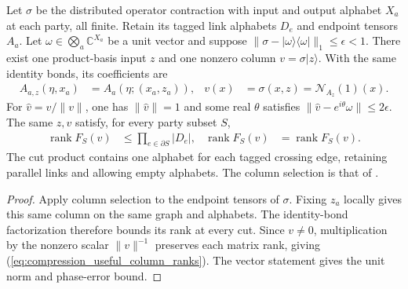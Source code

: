 \begin{lemma}
    \label{thm:compression_useful_column_all_cuts}
    \leanok
    Let $\sigma$ be the distributed operator contraction with
    input and output alphabet $X_a$ at each party, all finite. Retain its
    tagged link alphabets $D_e$ and endpoint tensors $A_a$.
    Let $\omega\in\bigotimes_a\mathbb C^{X_a}$ be a unit vector and suppose
    $\|\sigma-|\omega\rangle\langle\omega|\|_1\le\epsilon<1$.
    There exist one product-basis input $z$ and one nonzero column
    $v=\sigma|z\rangle$. With the same identity bonds, its coefficients are
    \begin{align}
        A_{a,z}(\eta,x_a) & =A_a(\eta;(x_a,z_a)),                &
        v(x)              & =\sigma(x,z)=\mathcal N_{A_z}(1)(x).
        \label{eq:compression_useful_column_tensor}
    \end{align}
    For $\widehat v=v/\|v\|$, one has $\|\widehat v\|=1$ and some real
    $\theta$ satisfies $\|\widehat v-e^{i\theta}\omega\|\le2\epsilon$.
    The same $z,v$ satisfy, for every party subset $S$,
    \begin{align}
        \operatorname{rank}F_S(v)
         & \le\prod_{e\in\partial S}|D_e|, &
        \operatorname{rank}F_S(\widehat v)
         & =\operatorname{rank}F_S(v).
        \label{eq:compression_useful_column_ranks}
    \end{align}
    The cut product contains one alphabet for each tagged crossing
    edge, retaining parallel links and allowing empty alphabets.
    The column selection is that of
    \cite[Lemma~8.1]{OpenAI2026PolynomialPEPS}.
    
\end{lemma}
\begin{proof}\leanok
    Apply column selection to the endpoint tensors
    of $\sigma$. Fixing $z_a$ locally gives this same column on the
    same graph and alphabets. The identity-bond factorization therefore
    bounds its rank at every cut. Since $v\ne0$, multiplication by the
    nonzero scalar $\|v\|^{-1}$ preserves each matrix rank, giving
    (\ref{eq:compression_useful_column_ranks}). The vector statement
    gives the unit norm and phase-error bound.
\end{proof}


